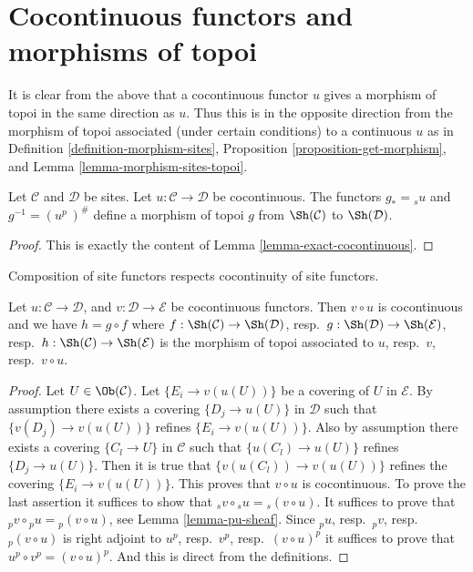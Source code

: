 \section{Cocontinuous functors and morphisms of topoi}
\label{section-cocontinuous-morphism-topoi}

\noindent
It is clear from the above that a cocontinuous functor $u$
gives a morphism of topoi in the same direction as $u$.
Thus this is in the opposite direction from the morphism of topoi
associated (under certain conditions) to a continuous $u$ as in
Definition \ref{definition-morphism-sites},
Proposition \ref{proposition-get-morphism}, and
Lemma \ref{lemma-morphism-sites-topoi}.

\begin{lemma}
\label{lemma-cocontinuous-morphism-topoi}
Let $\mathcal{C}$ and $\mathcal{D}$ be sites.
Let $u : \mathcal{C} \to \mathcal{D}$ be cocontinuous.
The functors $g_* = {}_su$ and $g^{-1} = (u^p\ )^\#$
define a morphism of topoi
$g$ from  $\Sh(\mathcal{C})$ to $\Sh(\mathcal{D})$.
\end{lemma}

\begin{proof}
This is exactly the content of Lemma \ref{lemma-exact-cocontinuous}.
\end{proof}

\begin{lemma}
\label{lemma-composition-cocontinuous}
\begin{slogan}
Composition of site functors respects cocontinuity of site functors.
\end{slogan}
Let $u : \mathcal{C} \to \mathcal{D}$, and $v : \mathcal{D} \to \mathcal{E}$
be cocontinuous functors. Then $v \circ u$ is cocontinuous and we
have $h = g \circ f$
where $f : \Sh(\mathcal{C}) \to \Sh(\mathcal{D})$,
resp.\ $g : \Sh(\mathcal{D}) \to \Sh(\mathcal{E})$,
resp.\ $h : \Sh(\mathcal{C}) \to \Sh(\mathcal{E})$ is the
morphism of topoi associated to $u$, resp.\ $v$, resp.\ $v \circ u$.
\end{lemma}

\begin{proof}
Let $U \in \Ob(\mathcal{C})$.
Let $\{E_i \to v(u(U))\}$ be a covering of $U$ in $\mathcal{E}$.
By assumption there exists a covering $\{D_j \to u(U)\}$ in $\mathcal{D}$
such that $\{v(D_j) \to v(u(U))\}$ refines $\{E_i \to v(u(U))\}$. Also
by assumption there exists a covering $\{C_l \to U\}$ in $\mathcal{C}$
such that $\{u(C_l) \to u(U)\}$ refines $\{D_j \to u(U)\}$. Then it is
true that $\{v(u(C_l)) \to v(u(U))\}$ refines the covering
$\{E_i \to v(u(U))\}$. This proves that $v \circ u$ is cocontinuous.
To prove the last assertion it suffices to show that
${}_sv \circ {}_su = {}_s(v \circ u)$. It suffices to prove that
${}_pv \circ {}_pu = {}_p(v \circ u)$, see Lemma \ref{lemma-pu-sheaf}.
Since ${}_pu$, resp.\ ${}_pv$, resp.\ ${}_p(v \circ u)$ is right adjoint to
$u^p$, resp.\ $v^p$, resp.\ $(v \circ u)^p$ it suffices to prove that
$u^p \circ v^p = (v \circ u)^p$. And this is direct from the definitions.
\end{proof}

